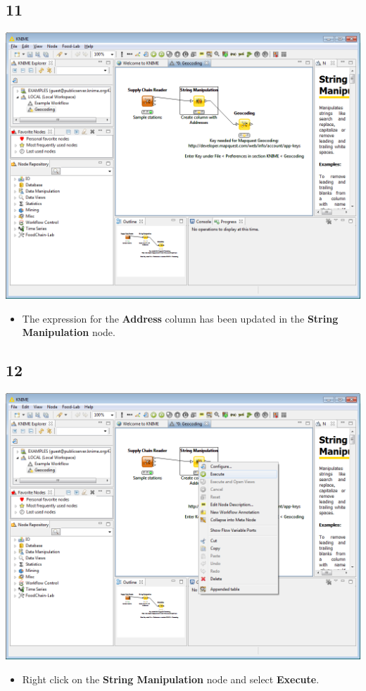\documentclass{beamer}
\begin{document}
\subsection{11}
\begin{frame}
	\begin{center}
  		\includegraphics[height=0.6\textheight]{11.png}
	\end{center}
	\begin{itemize}
		\item The expression for the \textbf{Address} column has been updated in the \textbf{String Manipulation} node.
	\end{itemize}
\end{frame}

\subsection{12}
\begin{frame}
	\begin{center}
  		\includegraphics[height=0.6\textheight]{12.png}
	\end{center}
	\begin{itemize}
		\item Right click on the \textbf{String Manipulation} node and select \textbf{Execute}.
	\end{itemize}
\end{frame}
\end{document}
